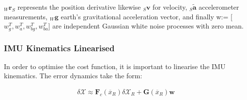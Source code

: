\documentclass[a4paper,11pt,notitlepage]{article}
\begin{document}
 $_{W} \textbf{\.{r}}_{S}$ represents the position derivative likewise $_{S}\textbf{\.{v}}$ for velocity,  $_{S}\tilde{\textbf{a}}$ accelerometer measurements, $_{W}\textbf{g}$ earth's gravitational acceleration vector, and finally w:= [$w_{g}^{T},w_{a}^{T},w_{bg}^{T},w_{ba}^{T}$] are independent Gaussian white noise processes with zero mean.
 
 \subsubsection{IMU Kinematics Linearised}
 
 In order to optimise the cost function, it is important to linearise the IMU kinematics. The error dynamics take the form:
 
\begin{equation}
\begin{aligned}
\delta \mathcal{X} \approx  \textbf{F}_{c} (\overline{x}_{R}) \delta \mathcal{X}_{R} + \textbf{G}(\overline{x}_{R})\textbf{w} \\
\end{aligned}
\end{equation}
\end{document}

